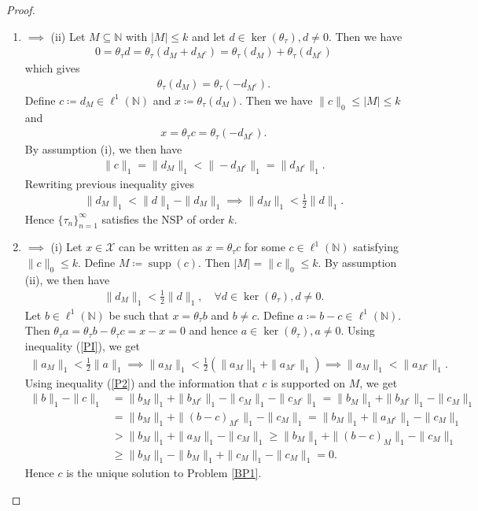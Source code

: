 \documentclass{amsart}
\begin{document}
\begin{proof}
\begin{enumerate}[\upshape(i)]
	\item 	$\implies$ (ii) Let $ M \subseteq \mathbb{N} $ with $|M|\leq k$ and let $d \in \ker(\theta_\tau), d \neq 0$. Then we have 
	\begin{align*}
	0=\theta_\tau d=\theta_\tau(d_M+d_{M^c})=\theta_\tau(d_M)+\theta_\tau(d_{M^c})
	\end{align*}
which gives 
\begin{align*}
	\theta_\tau(d_M)=\theta_\tau(-d_{M^c}).
\end{align*}
Define $c\coloneqq d_M \in \ell^1(\mathbb{N})$ and $x\coloneqq \theta_\tau(d_M)$. Then we have $\|c\|_0\leq |M|\leq k$ and 
\begin{align*}
	x=\theta_\tau c=\theta_\tau(-d_{M^c}).
\end{align*}
By assumption (i),  we then have 
\begin{align*}
	\|c\|_1=\|d_M\|_1<\|-d_{M^c}\|_1=\|d_{M^c}\|_1.
\end{align*}
Rewriting previous inequality gives 
\begin{align*}
	\|d_M\|_1<\|d\|_1-\|d_M\|_1 \implies 	\|d_M\|_1<\frac{1}{2}\|d\|_1.
\end{align*}
Hence $\{\tau_n \}_{n=1}^\infty$  satisfies the  NSP of order $k$.
	\item    $\implies$ (i)  Let  $x \in \mathcal{X}$ can be written as  $	x=\theta_\tau c$ for some  $c \in \ell^1(\mathbb{N})$ satisfying $\|c\|_0\leq k$. Define $M\coloneqq \operatorname{supp}(c)$. Then $|M|=\|c\|_0 \leq k$. By assumption (ii), we then have 
	\begin{align}\label{PI}
	\|d_M\|_1<\frac{1}{2}\|d\|_1,  \quad  \forall d \in \ker(\theta_\tau), d \neq 0.
\end{align}
Let $b\in \ell^1(\mathbb{N})$ be such that $x=\theta_\tau b$ and $b\neq c$. Define $a\coloneqq b-c \in \ell^1(\mathbb{N})$. Then $\theta_\tau a=\theta_\tau b-\theta_\tau c=x-x=0$  and hence $a \in \ker(\theta_\tau), a \neq 0$. Using inequality (\ref{PI}), we get 
\begin{align}\label{P2}
	\|a_M\|_1<\frac{1}{2}\|a\|_1 \implies \|a_M\|_1<\frac{1}{2}(\|a_{M}\|_1+\|a_{M^c}\|_1) \implies \|a_M\|_1<\|a_{M^c}\|_1.
\end{align}
Using inequality (\ref{P2}) and the information that $c$ is supported on $M$, we get 
\begin{align*}
\|b\|_1-\|c\|_1&=\|b_M\|_1+\|b_{M^c}\|_1-\|c_M\|_1-\|c_{M^c}\|_1=\|b_M\|_1+\|b_{M^c}\|_1-\|c_M\|_1\\
&=\|b_M\|_1+\|(b-c)_{M^c}\|_1-\|c_M\|_1=\|b_M\|_1+\|a_{M^c}\|_1-\|c_M\|_1\\
&>\|b_M\|_1+\|a_M\|_1-\|c_M\|_1\geq \|b_M\|_1+\|(b-c)_M\|_1-\|c_M\|_1\\
&\geq \|b_M\|_1-\|b_M\|_1+\|c_M\|_1-\|c_M\|_1= 0.
\end{align*}
Hence $c$ is the unique solution to Problem \ref{BP1}.
\end{enumerate}	
\end{proof}
\end{document}
